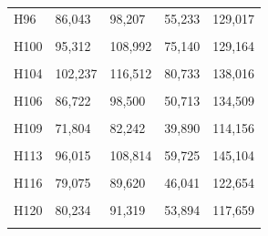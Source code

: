 \documentclass[
  a4paper,
  titlepage]{article}
\begin{document}
\begin{longtable}[t]{lllll}
H96 & 86,043 & 98,207 & 55,233 & 129,017\\
 
\cellcolor{gray!6}{H97} & \cellcolor{gray!6}{68,310} & \cellcolor{gray!6}{77,884} & \cellcolor{gray!6}{36,897} & \cellcolor{gray!6}{109,297}\\
 
H100 & 95,312 & 108,992 & 75,140 & 129,164\\
 
\cellcolor{gray!6}{H102} & \cellcolor{gray!6}{89,143} & \cellcolor{gray!6}{101,588} & \cellcolor{gray!6}{66,507} & \cellcolor{gray!6}{124,224}\\
 
H104 & 102,237 & 116,512 & 80,733 & 138,016\\
 
\cellcolor{gray!6}{H105} & \cellcolor{gray!6}{60,509} & \cellcolor{gray!6}{68,498} & \cellcolor{gray!6}{30,448} & \cellcolor{gray!6}{98,559}\\
 
H106 & 86,722 & 98,500 & 50,713 & 134,509\\
 
\cellcolor{gray!6}{H108} & \cellcolor{gray!6}{69,802} & \cellcolor{gray!6}{79,399} & \cellcolor{gray!6}{39,604} & \cellcolor{gray!6}{109,597}\\
 
H109 & 71,804 & 82,242 & 39,890 & 114,156\\
 
\cellcolor{gray!6}{H112} & \cellcolor{gray!6}{94,700} & \cellcolor{gray!6}{107,925} & \cellcolor{gray!6}{61,817} & \cellcolor{gray!6}{140,808}\\
 
H113 & 96,015 & 108,814 & 59,725 & 145,104\\
 
\cellcolor{gray!6}{H115} & \cellcolor{gray!6}{116,206} & \cellcolor{gray!6}{133,012} & \cellcolor{gray!6}{101,995} & \cellcolor{gray!6}{147,223}\\
 
H116 & 79,075 & 89,620 & 46,041 & 122,654\\
 
\cellcolor{gray!6}{H117} & \cellcolor{gray!6}{95,579} & \cellcolor{gray!6}{109,021} & \cellcolor{gray!6}{73,247} & \cellcolor{gray!6}{131,353}\\
 
H120 & 80,234 & 91,319 & 53,894 & 117,659\\
 
\cellcolor{gray!6}{H121} & \cellcolor{gray!6}{76,915} & \cellcolor{gray!6}{87,247} & \cellcolor{gray!6}{43,873} & \cellcolor{gray!6}{120,289}\\
 

\end{longtable}
\end{document}
